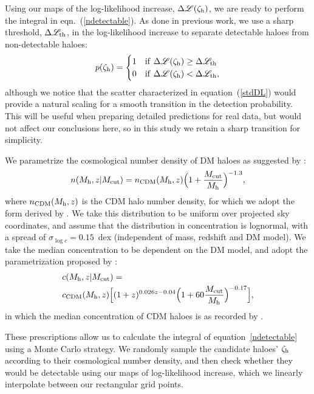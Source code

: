 \documentclass[a4paper, fleqn, usenatbib, useAMS]{mnras}
\def\zh{\zeta_{\rm h}}
\def\DL{\Delta\mathscr{L}}
\begin{document}
Using our maps of the log-likelihood increase, $\DL(\zh)$, we are ready to perform the integral in 
eqn.~(\ref{ndetectable}). As done in previous work, we use a sharp threshold, $\DL_{\rm th}$, in the 
log-likelihood increase to separate detectable haloes from non-detectable haloes:
%
 \begin{equation}
 p(\zh) = 
 	\begin{cases}
	1 &{\rm if}\  \DL(\zh)\geq \DL_{\rm th}\\
	0 &{\rm if}\  \DL(\zh)< \DL_{\rm th},\\
	 \end{cases}
\label{pofdl}
\end{equation}
%
although we notice that the scatter characterized in equation~(\ref{stdDL}) would provide a 
{natural} scaling for a smooth transition in the detection probability. This will be useful when preparing detailed 
predictions for real data, but would not affect our conclusions here,
so in this study we retain a sharp transition for simplicity. 



We parametrize the cosmological number density of DM haloes as suggested by \citet{Lovell2014}:
%
 \begin{equation}
n(M_{\rm h},z | M_{\rm cut}) = n_{\rm CDM}(M_{\rm h},z)\Big(1+{M_{\rm cut}\over M_{\rm h}}\Big)^{-1.3},
\label{halomassf}
\end{equation}
%
where $n_{\rm CDM}(M_{\rm h},z)$ is the CDM halo number density, for which we adopt the form
derived by \citet{Sheth2001}. We take this distribution to be uniform over projected sky coordinates,
and assume that the distribution in concentration is lognormal, with a spread of $\sigma_{\log c}=0.15$~dex 
(independent of mass, redshift and DM model). We take the median concentration to be dependent on
the DM model, and adopt the parametrization proposed by \citet{Bose16}:
%
\begin{align}
&c(M_{\rm h},z | M_{\rm cut}) = \nonumber  \\
&c_{\rm CDM}(M_{\rm h},z)\Big[(1+z)^{0.026z-0.04}\Big(1+60{M_{\rm cut}\over M_{\rm h}}\Big)^{-0.17}\Big],
\label{mcrel}
\end{align}
%
in which the median concentration of CDM haloes is as recorded by \citet{Ludlow2016}.

These prescriptions allow us to calculate the integral of equation~\ref{ndetectable} using a Monte Carlo strategy.
We randomly sample the candidate haloes' $\zh$ according to their cosmological number density, and then check 
whether they would be detectable using our maps of log-likelihood increase, which we linearly interpolate 
between our rectangular grid points.
\end{document}
